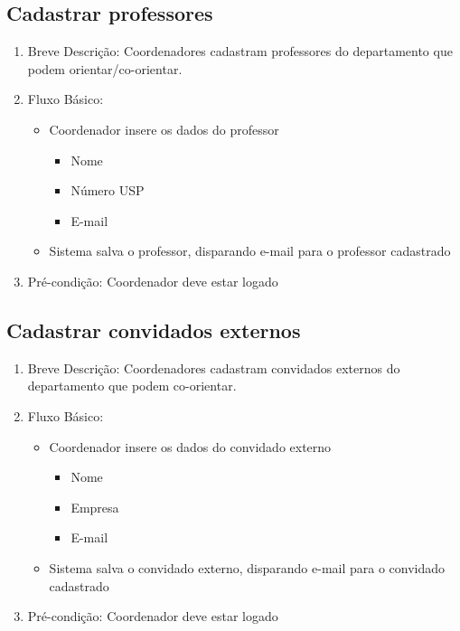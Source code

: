 \subsection{Cadastrar professores}
\begin{enumerate}
    \item Breve Descrição: Coordenadores cadastram professores do departamento que podem orientar/co-orientar.
    \item Fluxo Básico:
    \begin{itemize}
        \item Coordenador insere os dados do professor
        \begin{itemize}
            \item Nome
            \item Número USP
            \item E-mail
        \end{itemize}
        \item Sistema salva o professor, disparando e-mail para o professor cadastrado
    \end{itemize}
    \item Pré-condição: Coordenador deve estar logado
\end{enumerate}

\subsection{Cadastrar convidados externos}
\begin{enumerate}
    \item Breve Descrição: Coordenadores cadastram convidados externos do departamento que podem co-orientar.
    \item Fluxo Básico:
    \begin{itemize}
        \item Coordenador insere os dados do convidado externo
        \begin{itemize}
            \item Nome
            \item Empresa
            \item E-mail
        \end{itemize}
        \item Sistema salva o convidado externo, disparando e-mail para o convidado cadastrado
    \end{itemize}
    \item Pré-condição: Coordenador deve estar logado
\end{enumerate}

